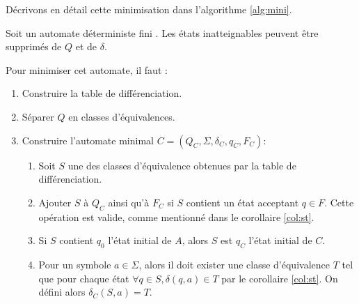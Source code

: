 Décrivons en détail cette minimisation dans l'algorithme \ref{alg:mini}.

\begin{algo}[Minimisation]\label{alg:mini}
Soit un automate déterministe fini \automaton. Les états inatteignables peuvent être supprimés de $Q$ et de $\delta$.

Pour minimiser cet automate, il faut :
\begin{enumerate}
 \item Construire la table de différenciation.
 \item Séparer $Q$ en classes d'équivalences.
 \item Construire l'automate minimal $C=(Q_C,\Sigma, \delta_C, q_C, F_C)$:
 \begin{enumerate}
	 \item Soit $S$ une des classes d'équivalence obtenues par la table de différenciation.
	 \item Ajouter $S$ à $Q_C$ ainsi qu'à $F_C$ si $S$ contient un état acceptant $q\in F$. Cette opération est valide, comme mentionné dans le corollaire \ref{col:st}.
	 \item Si $S$ contient $q_0$ l'état initial de $A$, alors $S$ est $q_C$ l'état initial de $C$.
	 \item Pour un symbole $a \in \Sigma$, alors il doit exister une classe d'équivalence $T$ tel que pour chaque état $\forall q \in S,\delta(q,a) \in T$ par le corollaire \ref{col:st}. On défini alors $\delta_C(S,a)=T$.
 \end{enumerate}
\end{enumerate}
\end{algo}

